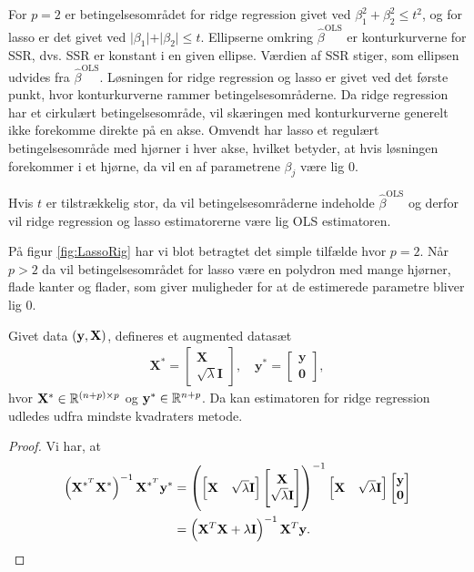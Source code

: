 %
For $p=2$ er betingelsesområdet for ridge regression givet ved $\beta_1^2 + \beta_2^2 \leq t^2$, og for lasso er det givet ved $\vert \beta_1 \vert + \vert \beta_2 \vert \leq t$.
Ellipserne omkring $\hat{\beta}^{\text{OLS}}$ er konturkurverne for SSR, dvs. SSR er konstant i en given ellipse. Værdien af SSR stiger, som ellipsen udvides fra $\hat{\beta}^{\text{OLS}}$.
Løsningen for ridge regression og lasso er givet ved det første punkt, hvor konturkurverne rammer betingelsesområderne.
Da ridge regression har et cirkulært betingelsesområde, vil skæringen med konturkurverne generelt ikke forekomme direkte på en akse.
Omvendt har lasso et regulært betingelsesområde med hjørner i hver akse, hvilket betyder, at hvis løsningen forekommer i et hjørne, da vil en af parametrene $\beta_j$ være lig 0.

Hvis $t$ er tilstrækkelig stor, da vil betingelsesområderne indeholde $\hat{\beta}^{\text{OLS}}$ og derfor vil ridge regression og lasso estimatorerne være lig OLS estimatoren.

På figur \ref{fig:LassoRig} har vi blot betragtet det simple tilfælde hvor $p=2$. 
Når \(p>2\) da vil betingelsesområdet for lasso være en polydron med mange hjørner, flade kanter og flader, som giver muligheder for at de estimerede parametre bliver lig 0.
%
\begin{lem}
Givet data \(\del{\y, \X}\), defineres et augmented datasæt
\begin{align*}
\mathbf{X}^* = \begin{bmatrix}
\mathbf{X} \\ \sqrt{\lambda} \mathbf{I}
\end{bmatrix}, \quad 
\mathbf{y}^* = \begin{bmatrix}
\mathbf{y} \\ \mathbf{0}
\end{bmatrix},
\end{align*}
hvor \(\X^* \in \mathbb{R}^{\del{n+p} \times p}\) og \(\mathbf{y}^* \in \mathbb{R}^{n+p}\). Da kan estimatoren for ridge regression udledes udfra mindste kvadraters metode.
\end{lem}
%
\begin{proof}
Vi har, at
\begin{align*}
\del{\X^{*^T} \X^*}^{-1} \X^{*^T} \y^* &= \left( \begin{bmatrix}
\mathbf{X} & \sqrt{\lambda} \mathbf{I}
\end{bmatrix}
\begin{bmatrix}
\mathbf{X} \\ \sqrt{\lambda} \mathbf{I}
\end{bmatrix} \right)^{-1}
\begin{bmatrix}
\mathbf{X} & \sqrt{\lambda} \mathbf{I}
\end{bmatrix}
\begin{bmatrix}
\mathbf{y} \\ \mathbf{0}
\end{bmatrix} \\
&= \left( \mathbf{X}^T \mathbf{X} + \lambda \mathbf{I} \right)^{-1} \mathbf{X}^T \mathbf{y}.
\end{align*}
\end{proof}
%

